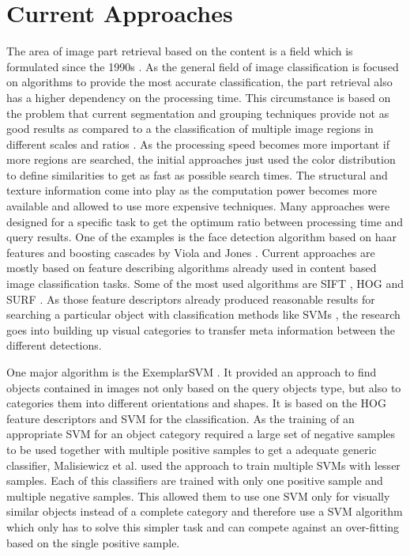 \chapter{Current Approaches}

The area of image part retrieval based on the content is a field which is formulated since the 1990s \cite{eakins1999content} \cite{rui1997content} \cite{osuna1997training}. As the general field of image classification is focused on algorithms to provide the most accurate classification, the part retrieval also has a higher dependency on the processing time. This circumstance is based on the problem that current segmentation and grouping techniques provide not as good results as compared to a the classification of multiple image regions in different scales and ratios \cite{book:848523}. As the processing speed becomes more important if more regions are searched, the initial approaches just used the color distribution to define similarities to get as fast as possible search times. The structural and texture information come into play as the computation power becomes more available and allowed to use more expensive techniques. Many approaches were designed for a specific task to get the optimum ratio between processing time and query results. One of the examples is the face detection algorithm based on haar features and boosting cascades by Viola and Jones \cite{viola2001rapid}. Current approaches are mostly based on feature describing algorithms already used in content based image classification tasks. Some of the most used algorithms are \acf{SIFT} \cite{Lowe2004}, \acf{HOG} \cite{Dalal2005} and \acf{SURF} \cite{bay2008speeded}. As those feature descriptors already produced reasonable results for searching a particular object with classification methods like \aclp{SVM} \cite{cortes1995support}, the research goes into building up visual categories to transfer meta information between the different detections.

One major algorithm is the ExemplarSVM \cite{Malisiewicz2011}. It provided an approach to find objects contained in images not only based on the query objects type, but also to categories them into different orientations and shapes.
It is based on the \ac{HOG} feature descriptors and \ac{SVM} for the classification. As the training of an appropriate \ac{SVM} for an object category required a large set of negative samples to be used together with multiple positive samples to get a adequate generic classifier, Malisiewicz et al. used the approach to train multiple \acp{SVM} with lesser samples. Each of this classifiers are trained with only one positive sample and multiple negative samples. This allowed them to use one \ac{SVM} only for visually similar objects instead of a complete category and therefore use a \ac{SVM} algorithm which only has to solve this simpler task and can compete against an over-fitting based on the single positive sample.%